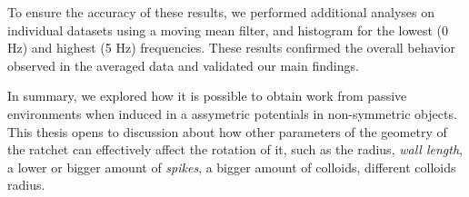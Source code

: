 To ensure the accuracy of these results, we performed additional analyses on individual datasets using a moving mean filter, and histogram for the lowest (0 Hz) and highest (5 Hz) frequencies. These results confirmed the overall behavior observed in the averaged data and validated our main findings.

In summary, we explored how it is possible to obtain work from passive environments when induced in a assymetric potentials in non-symmetric objects. This thesis opens to discussion about how other parameters of the geometry of the ratchet can effectively affect the rotation of it, such as the radius, \textit{wall length}, a lower or bigger amount of \textit{spikes}, a bigger amount of colloids, different colloids radius. 
